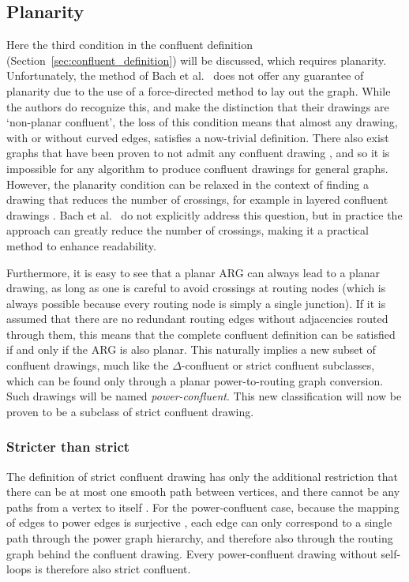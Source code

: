 \subsection{Planarity}
\label{sec:power_planarity}
Here the third condition in the confluent definition (Section~\ref{sec:confluent_definition}) will be discussed, which requires planarity. Unfortunately, the method of Bach et al.\ \cite{Bach2017} does not offer any guarantee of planarity due to the use of a force-directed method to lay out the graph.
While the authors do recognize this, and make the distinction that their drawings are `non-planar confluent', the loss of this condition means that almost any drawing, with or without curved edges, satisfies a now-trivial definition.
There also exist graphs that have been proven to not admit any confluent drawing \cite{Dickerson2005}, and so it is impossible for any algorithm to produce confluent drawings for general graphs.
However, the planarity condition can be relaxed in the context of finding a drawing that reduces the number of crossings, for example in layered confluent drawings \cite{Eppstein2007}. Bach et al.\ \cite{Bach2017} do not explicitly address this question, but in practice the approach can greatly reduce the number of crossings, making it a practical method to enhance readability.

Furthermore, it is easy to see that a planar ARG can always lead to a planar drawing, as long as one is careful to avoid crossings at routing nodes (which is always possible because every routing node is simply a single junction). If it is assumed that there are no redundant routing edges without adjacencies routed through them, this means that the complete confluent definition can be satisfied if and only if the ARG is also planar.
This naturally implies a new subset of confluent drawings, much like the $\Delta$-confluent \cite{Eppstein2005} or strict confluent \cite{Eppstein2013} subclasses, which can be found only through a planar power-to-routing graph conversion. Such drawings will be named \emph{power-confluent}.
This new classification will now be proven to be a subclass of strict confluent drawing. 

\subsubsection{Stricter than strict}
The definition of strict confluent drawing has only the additional restriction that there can be at most one smooth path between vertices, and there cannot be any paths from a vertex to itself \cite{Eppstein2013}. 
For the power-confluent case, because the mapping of edges to power edges is surjective \cite{Royer2008}, each edge can only correspond to a single path through the power graph hierarchy, and therefore also through the routing graph behind the confluent drawing. Every power-confluent drawing without self-loops is therefore also strict confluent.

